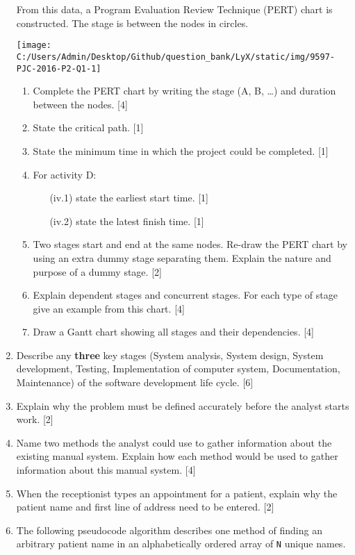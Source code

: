 \begin{enumerate}
From this data, a Program Evaluation Review Technique (PERT) chart
is constructed. The stage is between the nodes in circles. 
\begin{center}
\texttt{[image: C:/Users/Admin/Desktop/Github/question\_bank/LyX/static/img/9597-PJC-2016-P2-Q1-1]}
\par\end{center}
\begin{enumerate}
\item Complete the PERT chart by writing the stage (A, B, \dots ) and duration
between the nodes. \hfill{}{[}4{]}
\item State the critical path. \hfill{}{[}1{]}
\item State the minimum time in which the project could be completed. \hfill{}{[}1{]}
\item For activity D: 
\begin{enumerate}
\item[(iv.1)]  state the earliest start time. \hfill{}{[}1{]}
\item[(iv.2)]  state the latest finish time. \hfill{}{[}1{]}
\end{enumerate}
\item Two stages start and end at the same nodes. Re-draw the PERT chart
by using an extra dummy stage separating them. Explain the nature
and purpose of a dummy stage. \hfill{}{[}2{]}
\item Explain dependent stages and concurrent stages. For each type of stage
give an example from this chart. \hfill{}{[}4{]}
\item Draw a Gantt chart showing all stages and their dependencies.\hfill{}
{[}4{]}
\end{enumerate}
\item Describe any \textbf{three} key stages (System analysis, System design,
System development, Testing, Implementation of computer system, Documentation,
Maintenance) of the software development life cycle. \hfill{}{[}6{]}
\item Explain why the problem must be defined accurately before the analyst
starts work. \hfill{}{[}2{]}
\item Name two methods the analyst could use to gather information about
the existing manual system. Explain how each method would be used
to gather information about this manual system. \hfill{}{[}4{]}
\item When the receptionist types an appointment for a patient, explain
why the patient name and first line of address need to be entered.
\hfill{}{[}2{]}
\item The following pseudocode algorithm describes one method of finding
an arbitrary patient name in an alphabetically ordered array of \texttt{N}
unique names. 


\end{enumerate}
